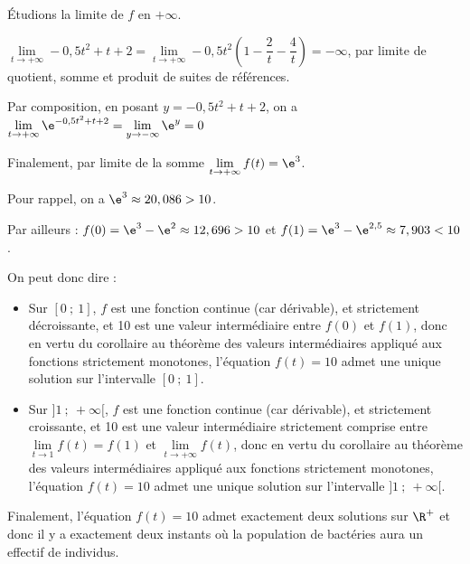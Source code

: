 Étudions la limite de $f$ en $+\infty$.

$\lim\limits_{t \to +\infty} -0,5t^2 + t +2 = \lim\limits_{t \to +\infty} -0,5t^2 \left(1 - \dfrac{2}{t} - \dfrac{4}{t}\right) = -\infty$, par limite de quotient, somme et produit de suites de références.

Par composition, en posant $y = -0,5t^2 + t +2$, on a $\lim\limits_{t \to+\infty} \e^{-0,5t^2 + t +2} = \lim\limits_{y\to -\infty} \e^y = 0$

Finalement, par limite de la somme $\lim\limits_{t \to +\infty} f(t) = \e^3$.

Pour rappel, on a $\e^3 \approx 20,086 > 10$.

Par ailleurs : $f(0) = \e^3 - \e^2 \approx 12,696 >10$ et $f(1) = \e^3 - \e^{2,5} \approx 7,903 < 10$.

On peut donc dire :

\begin{itemize}
\item Sur $ [0~;~1] $, $f$ est une fonction continue (car dérivable), et strictement décroissante, et 10 est une valeur intermédiaire entre $f(0)$ et $f(1)$, donc en vertu du corollaire au théorème des valeurs intermédiaires appliqué aux fonctions strictement monotones, l'équation $f(t)=10$ admet une unique solution sur l'intervalle $ [0~;~1] $.
\item Sur $ ]1~;~+\infty[ $, $f$ est une fonction continue (car dérivable), et strictement croissante, et 10 est une valeur intermédiaire strictement comprise entre $\lim\limits_{t \to 1}f(t)=f(1)$ et $\lim\limits_{t\to +\infty}f(t)$, donc en vertu du corollaire au théorème des valeurs intermédiaires appliqué aux fonctions strictement monotones, l'équation $f(t)=10$ admet une unique solution sur l'intervalle $]1~;~+\infty[$.
\end{itemize}

Finalement, l'équation $f(t) = 10$ admet exactement deux solutions sur $\R^+$ et donc il y a exactement deux instants où la population de bactéries aura un effectif de  individus.

